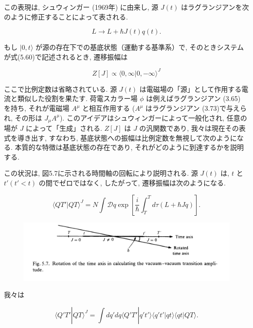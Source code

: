 \documentclass[a4paper,12pt]{article}
\begin{document}
この表現は, シュウィンガー (1969年) に由来し, 源 \( J(t) \) はラグランジアンを次のように修正することによって表される. 

\begin{equation*}
L \rightarrow L + \hbar J(t)q(t). \tag{5.60}
\end{equation*}

もし \( | 0, t \rangle \) が源の存在下での基底状態（運動する基準系）で, そのときシステムが式(5.60)で記述されるとき, 遷移振幅は

\begin{equation*}
Z[J] \propto \langle 0, \infty | 0, -\infty \rangle^J \tag{5.61}
\end{equation*}

ここで比例定数は省略されている. 源 \( J(t) \) は電磁場の「源」として作用する電流と類似した役割を果たす. 荷電スカラー場 \( \phi \) は例えばラグランジアン (3.65) を持ち, それが電磁場 \( A^\mu \) と相互作用する ($A^\mu$ はラグランジアン (3.73)で与えられ, その形は $J_\mu A^\mu$). このアイデアはシュウィンガーによって一般化され, 任意の場が \( J \) によって「生成」される. \( Z[J] \) は \( J \) の汎関数であり, 我々は現在その表式を導き出す, すなわち, 基底状態への振幅は比例定数を無視して次のようになる. 本質的な特徴は基底状態の存在であり, それがどのように到達するかを説明する.

この状況は, 図5.7に示される時間軸の回転により説明される. 源 \( J(t) \) は, \( t \) と \( t' (t' < t) \) の間でゼロではなく, したがって, 遷移振幅は次のようになる.

\begin{equation*}
\langle QT' | QT \rangle^J = N \int \mathcal{D}q \exp \left[ \frac{i}{\hbar} \int_T^T d\tau (L + \hbar Jq) \right]. \tag{5.62}
\end{equation*}

\begin{figure}[H]
    \centering
    \includegraphics[width=\textwidth]{figure/fig5-7.png}    
\end{figure}

我々は

\begin{equation*}
\langle Q'T' | QT \rangle^J = \int dq' dq \langle Q'T' | q't' \rangle \langle q't' | qt \rangle \langle qt | QT \rangle. \tag{5.63}
\end{equation*}
\end{document}
